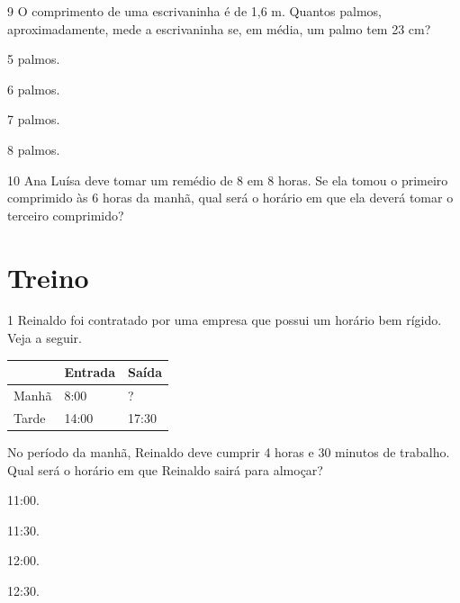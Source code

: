 \num{9} O comprimento de uma escrivaninha é de 1,6 m. Quantos palmos,
aproximadamente, mede a escrivaninha se, em média, um palmo tem 23 cm?

\begin{minipage}{.5\textwidth}
\begin{escolha}
\item
  5 palmos.
\item
  6 palmos.
\item
  7 palmos.
\item
  8 palmos.
\end{escolha}
\end{minipage}

\num{10} Ana Luísa deve tomar um remédio de 8 em 8 horas. Se ela tomou o primeiro
comprimido às 6 horas da manhã, qual será o horário em que ela deverá tomar
o terceiro comprimido?

\begin{mdframed}[linewidth=2pt,linecolor=salmao,roundcorner=2pt]


\end{mdframed}


\section{Treino}

\num{1} Reinaldo foi contratado por uma empresa que possui um horário bem rígido.
Veja a seguir.

\begin{longtable}[]{@{}lll@{}}
\toprule
& Entrada & Saída\tabularnewline
\midrule
\endhead
Manhã & 8:00 & ?\tabularnewline
Tarde & 14:00 & 17:30\tabularnewline
\bottomrule
\end{longtable}


No período da manhã, Reinaldo deve
cumprir 4 horas e 30 minutos de trabalho. Qual será o horário em que
Reinaldo sairá para almoçar?

\begin{escolha}
\item
  11:00.
\item
  11:30.
\item
  12:00.
\item
  12:30.
\end{escolha}

